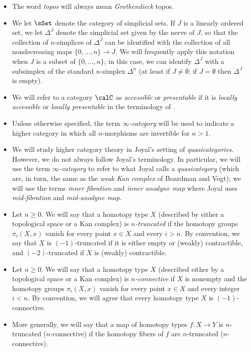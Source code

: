 \begin{itemize}
\item The word {\em topos} will always mean {\em Grothendieck} topos.

\item We let $\sSet$ denote the category of simplicial sets. If $J$ is a linearly ordered set, we
let $\Delta^{J}$ denote the simplicial set given by the nerve of $J$, so that
the collection of $n$-simplices of $\Delta^{J}$ can be identified with the collection
of all nondecreasing maps $\{0, \ldots, n \} \rightarrow J$. We will frequently apply this notation
when $J$ is a subset of $\{0, \ldots, n \}$; in this case, we can identify
$\Delta^{J}$ with a subsimplex of the standard $n$-simplex $\Delta^{n}$ (at
least if $J \neq \emptyset$; if $J = \emptyset$ then $\Delta^{J}$ is empty).

\item We will refer to a category $\calC$ as {\it accessible} or {\it presentable} if it is {\it locally accessible} or {\it locally presentable} in the terminology of \cite{makkai}.

\item Unless otherwise specified, the term {\it $\infty$-category} will be used to indicate a higher category in which all $n$-morphisms are invertible for $n > 1$.

\item We will study higher category theory in Joyal's setting of {\it quasicategories}. However, we do not always follow Joyal's terminology. In particular, we will use the term {\it $\infty$-category} to refer to what Joyal calls a {\it quasicategory} (which are, in turn, the same as the {\it weak Kan complex} of Boardman and Vogt); we will use the terms {\it inner fibration} and {\it inner anodyne map} where Joyal uses {\it mid-fibration} and {\it mid-anodyne map}.

\item Let $n \geq 0$. We will say that a homotopy type $X$ (described by either a topological space or a Kan complex) is {\it $n$-truncated} if the homotopy groups $\pi_{i}(X,x)$ vanish for every point $x \in X$
and every $i > n$. By convention, we say that $X$ is $(-1)$-truncated if it is either empty or (weakly) contractible, and $(-2)$-truncated if $X$ is (weakly) contractible.

\item Let $n \geq 0$. We will say that a homotopy type $X$ (described either by a topological space or a Kan complex) is {\it $n$-connective} if $X$ is nonempty and the homotopy groups $\pi_{i}(X,x)$ vanish for every point $x \in X$ and every integer $i < n$. By convention, we will agree that every homotopy type $X$ is $(-1)$-connective. 

\item More generally, we will say that a map of homotopy types $f: X \rightarrow Y$ is
$n$-truncated ($n$-connective) if the homotopy fibers of $f$ are $n$-truncated ($n$-connective).
\end{itemize}

